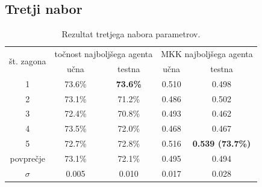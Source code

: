 \subsection{Tretji nabor}\label{subsec:dodatek-car-tretji-nabor}
\begin{table}[H]
    \begin{center}
        \begin{tabular}{|| c | c c || c c ||}
            \hline
            \multirow{2}{*}{št. zagona} & \multicolumn{2}{c||}{točnost najboljšega agenta} & \multicolumn{2}{c||}{MKK najboljšega agenta} \\ \cline{2-5}
            & učna   & testna          & učna  & testna                  \\
            \hline
            1         & 73.6\% & \textbf{73.6\%} & 0.510 & 0.498                   \\
            \hline
            2         & 73.1\% & 71.2\%          & 0.486 & 0.502                   \\
            \hline
            3         & 72.4\% & 70.8\%          & 0.493 & 0.462                   \\
            \hline
            4         & 73.5\% & 72.0\%          & 0.468 & 0.467                   \\
            \hline
            5         & 72.7\% & 72.8\%          & 0.516 & \textbf{0.539 (73.7\%)} \\
            \hline
            povprečje & 73.1\% & 72.1\%          & 0.495 & 0.494                   \\
            \hline
            $\sigma$  & 0.005  & 0.010           & 0.017 & 0.028                   \\
            \hline
        \end{tabular}
    \end{center}
    \caption{Rezultat tretjega nabora parametrov.}
    \label{tab:car_result_3}
\end{table}

